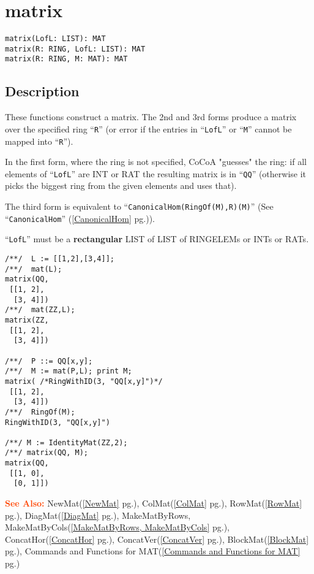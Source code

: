 \documentclass[a4paper]{mybook}
\newenvironment{command}{}{} %
\newcommand\SeeAlso{\par\textcolor{OrangeRed}{\textbf{\large See Also: }}}
\begin{document}
\section{matrix}
\label{matrix}
\begin{command} %


\begin{Verbatim}[label=syntax, rulecolor=\color{MidnightBlue},
frame=single]
matrix(LofL: LIST): MAT
matrix(R: RING, LofL: LIST): MAT
matrix(R: RING, M: MAT): MAT
\end{Verbatim}


\subsection*{Description}

These functions construct a matrix.
The 2nd and 3rd forms produce a matrix over the specified ring ``\verb&R&''
(or error if the entries in ``\verb&LofL&'' or ``\verb&M&'' cannot be mapped into ``\verb&R&'').
\par 
In the first form, where the ring is not specified, CoCoA "guesses" the
ring: if all elements of ``\verb&LofL&'' are \textsf{INT} or \textsf{RAT} the resulting matrix is in ``\verb&QQ&''
(otherwise it picks the biggest ring from the given elements and uses that).
\par 
The third form is equivalent to ``\verb&CanonicalHom(RingOf(M),R)(M)&''
(See ``\verb&CanonicalHom&'' (\ref{CanonicalHom} pg.\pageref{CanonicalHom})).
\par 
``\verb&LofL&'' must be a \textbf{rectangular} \textsf{LIST} of \textsf{LIST} of \textsf{RINGELEM}s or \textsf{INT}s or \textsf{RAT}s.
\begin{Verbatim}[label=example, rulecolor=\color{PineGreen}, frame=single]
/**/  L := [[1,2],[3,4]];
/**/  mat(L);
matrix(QQ,
 [[1, 2],
  [3, 4]])
/**/  mat(ZZ,L);
matrix(ZZ,
 [[1, 2],
  [3, 4]])

/**/  P ::= QQ[x,y];
/**/  M := mat(P,L); print M;
matrix( /*RingWithID(3, "QQ[x,y]")*/
 [[1, 2],
  [3, 4]])
/**/  RingOf(M);
RingWithID(3, "QQ[x,y]")

/**/ M := IdentityMat(ZZ,2);
/**/ matrix(QQ, M);
matrix(QQ,
 [[1, 0],
  [0, 1]])
\end{Verbatim}


\SeeAlso %
  NewMat(\ref{NewMat} pg.\pageref{NewMat}), 
    ColMat(\ref{ColMat} pg.\pageref{ColMat}), 
    RowMat(\ref{RowMat} pg.\pageref{RowMat}), 
    DiagMat(\ref{DiagMat} pg.\pageref{DiagMat}), 
    MakeMatByRows, MakeMatByCols(\ref{MakeMatByRows, MakeMatByCols} pg.\pageref{MakeMatByRows, MakeMatByCols}), 
    ConcatHor(\ref{ConcatHor} pg.\pageref{ConcatHor}), 
    ConcatVer(\ref{ConcatVer} pg.\pageref{ConcatVer}), 
    BlockMat(\ref{BlockMat} pg.\pageref{BlockMat}), 
    Commands and Functions for MAT(\ref{Commands and Functions for MAT} pg.\pageref{Commands and Functions for MAT})
\end{command} %
\end{document}
